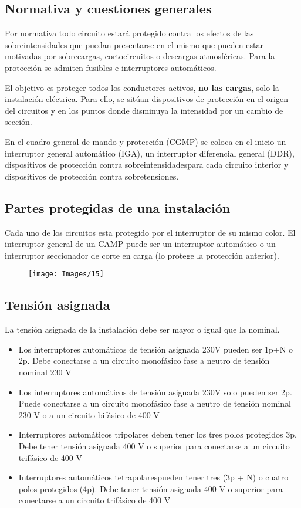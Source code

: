 \subsection{Normativa y cuestiones generales}
Por normativa todo circuito estará protegido contra los efectos de las sobreintensidades que puedan presentarse en el mismo que pueden estar motivadas por sobrecargas, cortocircuitos o descargas atmosféricas. Para la protección se admiten fusibles e interruptores automáticos.
\newline

El objetivo es proteger todos los conductores activos, \textbf{no las cargas}, solo la instalación eléctrica. Para ello, se sitúan dispositivos de protección en el origen del circuitos y en los puntos donde disminuya la intensidad por un cambio de sección.
\newline

En el cuadro general de mando y protección (CGMP) se coloca en el inicio un interruptor general automático (IGA), un interruptor diferencial general (DDR), dispositivos de protección contra sobreintensidadespara cada circuito interior y dispositivos de protección contra sobretensiones.
\subsection{Partes protegidas de una instalación}
Cada uno de los circuitos esta protegido por el interruptor de su mismo color. El interruptor general de un CAMP puede ser un interruptor automático o un interruptor seccionador de corte en carga (lo protege la protección anterior).
\begin{figure}[H]
	\centering
	\texttt{[image: Images/15]}
	\label{fig:15}
\end{figure}

\subsection{Tensión asignada}
La tensión asignada de la instalación debe ser mayor o igual que la nominal. 
\begin{itemize}
	\item Los interruptores automáticos de tensión asignada 230V pueden ser 1p+N o 2p. Debe conectarse a un circuito monofásico fase a neutro de tensión nominal 230 V
	\item Los interruptores automáticos de tensión asignada 230V solo pueden ser 2p. Puede conectarse a un circuito monofásico fase a neutro de tensión nominal 230 V o a un circuito bifásico de 400 V
	\item Interruptores automáticos tripolares deben tener los tres polos protegidos 3p. Debe tener tensión asignada 400 V o superior para conectarse a un circuito trifásico de 400 V
	\item Interruptores automáticos tetrapolarespueden tener tres (3p + N) o cuatro polos protegidos (4p). Debe tener tensión asignada 400 V o superior para conectarse a un circuito trifásico de 400 V
\end{itemize}


